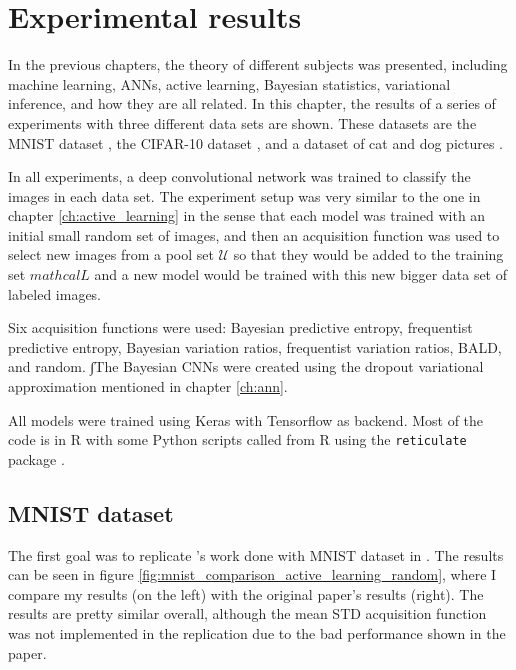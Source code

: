 
\chapter{Experimental results}
\label{ch:results}

In the previous chapters, the theory of different subjects was presented, including machine learning, ANNs, active learning, Bayesian statistics, variational inference, and how they are all related. In this chapter, the results of a series of experiments with three different data sets are shown. These datasets are the MNIST dataset \cite{lecun1998gradient}, the CIFAR-10 dataset \cite{krizhevsky2009learning}, and a dataset of cat and dog pictures \cite{elson2007asirra}.

In all experiments, a deep convolutional network was trained to classify the images in each data set. The experiment setup was very similar to the one in chapter \ref{ch:active_learning} in the sense that each model was trained with an initial small random set of images, and then an acquisition function was used to select new images from a pool set $\mathcal{U}$ so that they would be added to the training set $mathcal{L}$ and a new model would be trained with this new bigger data set of labeled images.

Six acquisition functions were used: Bayesian predictive entropy, frequentist predictive entropy, Bayesian variation ratios, frequentist variation ratios, BALD, and random. ∫The Bayesian CNNs were created using the dropout variational approximation mentioned in chapter \ref{ch:ann}.

All models were trained using Keras\cite{chollet2015keras} with Tensorflow \cite{tensorflow2015-whitepaper} as backend. Most of the code is in R with some Python scripts called from R using the \texttt{reticulate} package \cite{reticulate_package}.

\section{MNIST dataset}

The first goal was to replicate \citeauthor{Gal2016Active}'s work done with MNIST dataset in . The results can be seen in figure \ref{fig:mnist_comparison_active_learning_random}, where I compare my results (on the left) with the original paper's results (right). The results are pretty similar overall, although the mean STD acquisition function was not implemented in the replication due to the bad performance shown in the paper.

